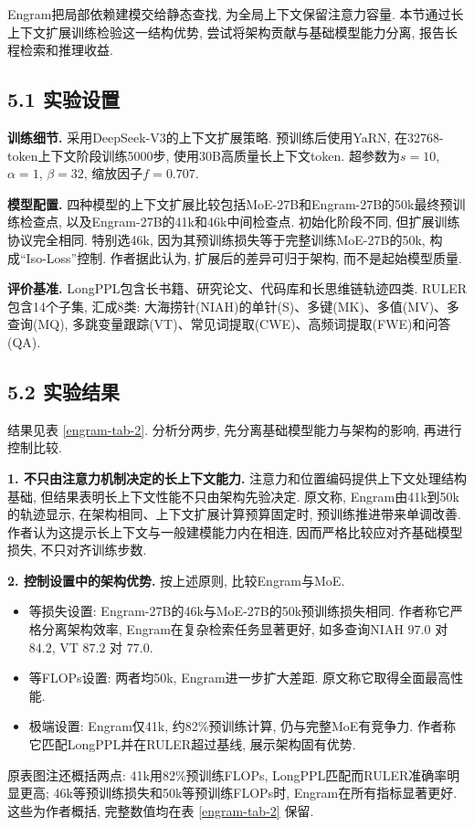 Engram把局部依赖建模交给静态查找, 为全局上下文保留注意力容量. 本节通过长上下文扩展训练\cite{engram-gao2025train,engram-peng2023yarn}检验这一结构优势, 尝试将架构贡献与基础模型能力分离, 报告长程检索和推理收益.

\subsection*{5.1 实验设置}
\noindent\textbf{训练细节.}
采用DeepSeek-V3\cite{engram-liu2024deepseek}的上下文扩展策略. 预训练后使用YaRN\cite{engram-peng2023yarn}, 在32768-token上下文阶段训练5000步, 使用30B高质量长上下文token. 超参数为$s=10$, $\alpha=1$, $\beta=32$, 缩放因子$f=0.707$.

\noindent\textbf{模型配置.}
四种模型的上下文扩展比较包括MoE-27B和Engram-27B的50k最终预训练检查点, 以及Engram-27B的41k和46k中间检查点. 初始化阶段不同, 但扩展训练协议完全相同. 特别选46k, 因为其预训练损失等于完整训练MoE-27B的50k, 构成“Iso-Loss”控制. 作者据此认为, 扩展后的差异可归于架构, 而不是起始模型质量.

\noindent\textbf{评价基准.}
LongPPL\cite{engram-fangwrong}包含长书籍、研究论文、代码库和长思维链轨迹四类. RULER\cite{engram-hsiehruler}包含14个子集, 汇成8类: 大海捞针(NIAH)的单针(S)、多键(MK)、多值(MV)、多查询(MQ), 多跳变量跟踪(VT)、常见词提取(CWE)、高频词提取(FWE)和问答(QA).



\subsection*{5.2 实验结果}
结果见表 \ref{engram-tab-2}. 分析分两步, 先分离基础模型能力与架构的影响, 再进行控制比较.

\noindent\textbf{1. 不只由注意力机制决定的长上下文能力.}
注意力和位置编码提供上下文处理结构基础\cite{engram-su2023roformerenhancedtransformerrotary,engram-press2021train,engram-yang2025path,engram-xiao2023efficient}, 但结果表明长上下文性能不只由架构先验决定. 原文称, Engram由41k到50k的轨迹显示, 在架构相同、上下文扩展计算预算固定时, 预训练推进带来单调改善. 作者认为这提示长上下文与一般建模能力内在相连, 因而严格比较应对齐基础模型损失, 不只对齐训练步数.

\noindent\textbf{2. 控制设置中的架构优势.}
按上述原则, 比较Engram与MoE.
\begin{itemize}
\item 等损失设置: Engram-27B的46k与MoE-27B的50k预训练损失相同. 作者称它严格分离架构效率, Engram在复杂检索任务显著更好, 如多查询NIAH $97.0$ 对 $84.2$, VT $87.2$ 对 $77.0$.
\item 等FLOPs设置: 两者均50k, Engram进一步扩大差距. 原文称它取得全面最高性能.
\item 极端设置: Engram仅41k, 约82\%预训练计算, 仍与完整MoE有竞争力. 作者称它匹配LongPPL并在RULER超过基线, 展示架构固有优势.
\end{itemize}
原表图注还概括两点: 41k用82\%预训练FLOPs, LongPPL匹配而RULER准确率明显更高; 46k等预训练损失和50k等预训练FLOPs时, Engram在所有指标显著更好. 这些为作者概括, 完整数值均在表 \ref{engram-tab-2} 保留.

